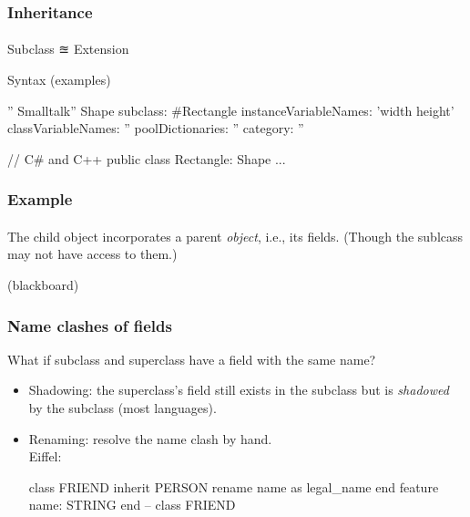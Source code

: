 \documentclass{beamer}
\begin{document}
\begin{frame}[fragile]
\frametitle{Inheritance}
\framesubtitle{}
Subclass ≊ Extension
\bigskip

Syntax (examples)

\begin{cplus3}
   '' Smalltalk''
    Shape subclass: #Rectangle
        instanceVariableNames: 'width height'
        classVariableNames: ''
        poolDictionaries: ''
        category: ''

     // C# and C++
     public class Rectangle: Shape 
     {
        ... 
     }

\end{cplus3}


\end{frame}


\begin{frame}[fragile]
\frametitle{Example}
\framesubtitle{}
\bigskip

The child object incorporates a parent \textit{object}, i.e., its fields.
(Though the sublcass may not have access to them.)

(blackboard)

\end{frame}

\begin{frame}[fragile]
\frametitle{Name clashes of fields }

What if subclass and superclass have a field with the same name?
\begin{itemize}
\item Shadowing: the superclass's field still exists in the subclass but is
\textit{shadowed} by the subclass (most languages).
\item Renaming: resolve the name clash by hand. \\
Eiffel:
\begin{eiffel}
class
   FRIEND
inherit
    PERSON
       rename
           name as legal_name
       end
feature
     name: STRING
end -- class FRIEND

\end{eiffel}
\end{itemize}
\end{frame}
\end{document}
